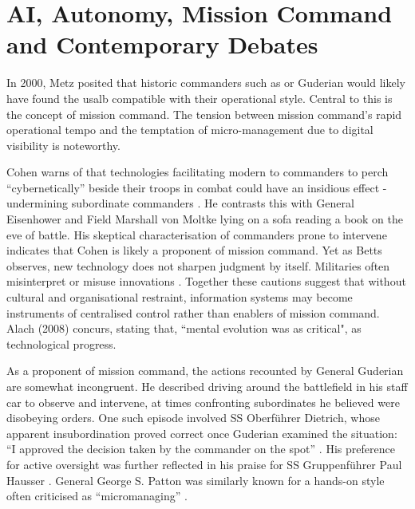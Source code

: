 \section{AI, Autonomy, Mission Command and Contemporary Debates} 
In 2000, Metz  posited that historic commanders such as  or Guderian would likely have found the \gls{usalb} compatible with their operational style\nocite{METZ_2000}. Central to this is the concept of mission command. The tension between mission command's rapid operational tempo and the temptation of micro-management due to digital visibility is noteworthy.

Cohen warns of that technologies facilitating modern to commanders to perch ``cybernetically'' beside their troops in combat could have an insidious effect - undermining subordinate commanders \parencite{COHEN_1996}. He contrasts this with General Eisenhower and Field Marshall von Moltke lying on a sofa reading a book on the eve of battle. His skeptical characterisation of commanders prone to intervene indicates that Cohen is likely a proponent of mission command. Yet as Betts observes, new technology does not sharpen judgment by itself. Militaries often misinterpret or misuse innovations \parencite{BETTS_1996}. Together these cautions suggest that without cultural and organisational restraint, information systems may become instruments of centralised control rather than enablers of mission command. Alach (2008) concurs, stating that, ``mental evolution was as critical", as technological progress\nocite{ALACH_2008}.

As a proponent of mission command, the actions recounted by General Guderian are somewhat incongruent. He described driving around the battlefield in his staff car to observe and intervene, at times confronting subordinates he believed were disobeying orders. One such episode involved SS Oberf\"uhrer  Dietrich, whose apparent insubordination proved correct once Guderian examined the situation: ``I approved the decision taken by the commander on the spot'' \parencite[p.~117]{GUDERIAN_1952}. His preference for active oversight was further reflected in his praise for SS Gruppenf\"uhrer Paul Hausser \parencite[p.~73]{YEIDE_2011}. General George S. Patton was similarly known for a hands-on style often criticised as ``micromanaging'' \parencite[p.~34]{ZALOGA_2010}.  

